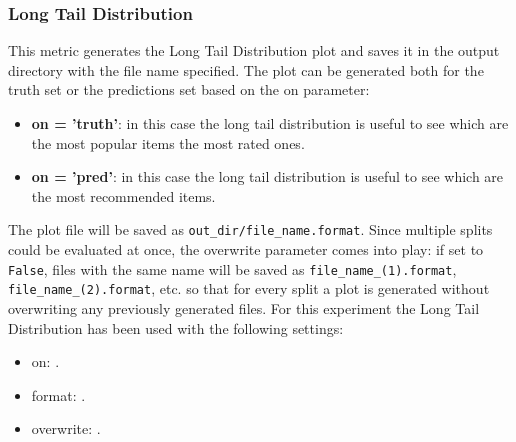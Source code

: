\subsubsection{Long Tail Distribution}\label{subsubsec:ltd}
This metric generates the Long Tail Distribution plot and saves it in the output directory with the file name
specified.
The plot can be generated both for the truth set or the predictions set based on the on parameter:
\begin{itemize}
    \item \textbf{on = 'truth'}: in this case the long tail distribution is useful to see which are the most popular items
       the most rated ones.
    \item \textbf{on = 'pred'}: in this case the long tail distribution is useful to see which are the most recommended
        items.
\end{itemize}
\hfill\break
\hfill\break
The plot file will be saved as \texttt{out\_dir/file\_name.format}.
Since multiple splits could be evaluated at once, the overwrite parameter comes into play:
if set to \texttt{False}, files with the same name will be saved as \texttt{file\_name\_(1).format}, \texttt{file\_name\_(2).format}, etc.
so that for every split a plot is generated without overwriting any previously generated files.
\hfill\break
\hfill\break
For this experiment the Long Tail Distribution has been used with the following settings:
\begin{itemize}
    \item on: .
    \item format: .
    \item overwrite: .
\end{itemize}
\hfill\break
\hfill\break


